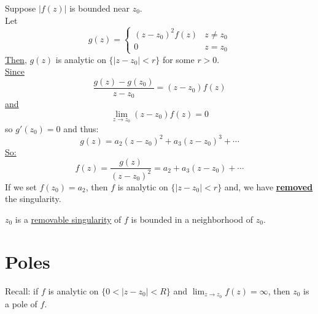 \begin{example}
    Suppose $|f(z)|$ is bounded near $z_0$. \\
    Let
    \begin{equation*}
        g(z) = \begin{cases}
            (z-z_0)^2 f(z) & z \neq z_0 \\
            0              & z = z_0
        \end{cases}
    \end{equation*}
    \underline{Then}, $g(z)$ is analytic on $\{|z-z_0| < r\}$ for some $r > 0$. \\

    \underline{Since}\\
    \begin{equation*}
        \frac{g(z) - g(z_0)}{z - z_0} = (z - z_0)f(z)
    \end{equation*}
    \underline{and}
    \begin{equation*}
        \lim_{z \to z_0} (z - z_0)f(z) = 0
    \end{equation*}
    so $g'(z_0) = 0$ and thus:
    \begin{equation*}
        g(z)  = a_2(z-z_0)^2 + a_3(z-z_0)^3 + \cdots
    \end{equation*}
    \underline{So:}
    \begin{equation*}
        f(z) = \frac{g(z)}{(z-z_0)^2} = a_2 + a_3(z-z_0) + \cdots
    \end{equation*}
    If we set $f(z_0) = a_2$, then $f$ is analytic on $\{|z - z_0| < r\}$ and, we have \underline{\textbf{removed}} the singularity.
\end{example}

\begin{definition}
    $z_0$ is a \underline{removable singularity} of $f$ is bounded in a neighborhood of $z_0$.
\end{definition}

\section{Poles}

\begin{remark}
    Recall: if $f$ is analytic on $\{0 < |z - z_0| < R \}$ and $\lim_{z \to z_0} f(z) = \infty$, then $z_0$ is a pole of $f$.
\end{remark}

